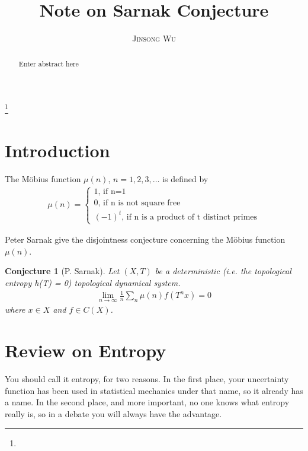 \documentclass[a4paper,10pt]{amsart}
\newtheorem{conjecture}{Conjecture}[section]
\newcommand{\titleinfo}{Note on Sarnak Conjecture}
\newcommand{\authorinfo}{Jinsong Wu}
\begin{document}
\title{\LARGE\textbf{\titleinfo}} 

\author{\large\textsc{\authorinfo}} 
\address{USTC}  
\email{}

\date{}


\begin{abstract}
Enter abstract here
\end{abstract}


\thanks{}

\maketitle

\section{Introduction}
The M\"{o}bius function $\mu(n)$, $n = 1, 2, 3, \ldots$ is defined by
\begin{align*}
    \mu(n) = \begin{cases}
    1  \mbox{, if n=1}\\
    0  \mbox{, if n is not square free}\\
    (-1)^t \mbox{, if n is a product of t distinct primes}
  \end{cases} 
\end{align*}

Peter Sarnak give the disjointness conjecture concerning the M\"{o}bius 
function $\mu(n)$.
\begin{conjecture}[P. Sarnak]
    Let $(X, T)$ be a deterministic (i.e. the topological entropy h(T) = 0)
    topological dynamical system.
    \begin{align*}
        \lim_{n \rightarrow \infty}\frac{1}{n}\sum_{n}\mu(n)f(T^{n}x) = 0
    \end{align*}
    where $x \in X$ and $f \in C(X)$. 
\end{conjecture}

\section{Review on Entropy}
 \begin{fquote}
    You should call it entropy, for two reasons. In the 
    first place, your uncertainty function has been used in 
    statistical mechanics under that name, so it already has a name. 
    In the second place, and more important, no one knows what entropy
really is, so in a debate you will always have the advantage.
 \end{fquote}
\end{document}
